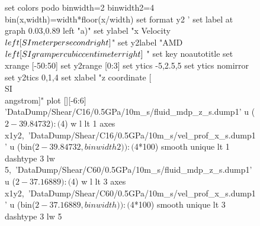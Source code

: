 \documentclass[5p]{elsarticle}
\begin{document}






\begin{figure}[htp]
    	\begin{center}
		\begin{gnuplot}[terminal=epslatex, terminaloptions={size \SERFigwidth cm, \SERFigheight cm color solid}]
			set colors podo
			binwidth=2
			binwidth2=4
			bin(x,width)=width*floor(x/width)
			set format y2 '%
			set label at graph 0.03,0.89 left "a)"
			set ylabel "x Velocity $\\left[ \\SI{}{\\meter\\per\\second} \\right]$"
			set y2label "AMD $\\left[ \\SI{}{\\gram\\per\\cubic\\centi\\meter} \\right]$ "
			set key noautotitle
			set xrange [-50:50]
			set y2range [0:3]
			set ytics  -5,2.5,5
			set ytics nomirror
			set y2tics 0,1,4
			set xlabel "z coordinate [\\SI{}{\\angstrom}]"  
			plot  	[][-6:6]  'DataDump/Shear/C16/0.5GPa/10m_s/fluid_mdp_z_s.dump1' u ($2-39.84732):($4) w l  lt 1 axes x1y2,\
				              'DataDump/Shear/C16/0.5GPa/10m_s/vel_prof_x_s.dump1'  u (bin($2-39.84732,binwidth2)):($4*100) smooth unique lt 1 dashtype 3 lw 5,\
                             		     'DataDump/Shear/C60/0.5GPa/10m_s/fluid_mdp_z_s.dump1' u ($2-37.16889):($4) w l  lt 3  axes x1y2,\
				              'DataDump/Shear/C60/0.5GPa/10m_s/vel_prof_x_s.dump1'  u (bin($2-37.16889,binwidth)):($4*100) smooth unique lt 3 dashtype 3 lw 5	
		\end{gnuplot}
		\begin{gnuplot}[terminal=epslatex, terminaloptions={size \SERFigwidth cm, \SERFigheight cm color solid}]

\end{gnuplot}
\end{center}
\end{figure}
\end{document}
